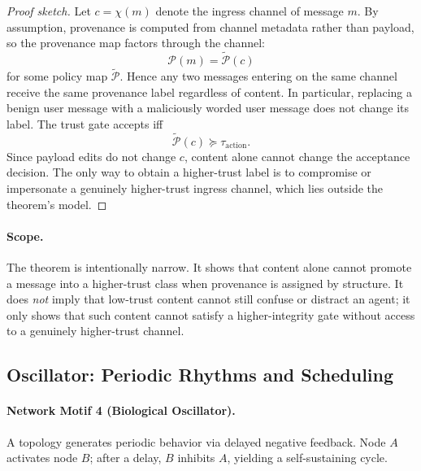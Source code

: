 \begin{proof}[Proof sketch]
Let $c=\chi(m)$ denote the ingress channel of message $m$. By assumption, provenance is computed from channel metadata rather than payload, so the provenance map factors through the channel:
\[
\mathcal{P}(m) = \widetilde{\mathcal{P}}(c)
\]
for some policy map $\widetilde{\mathcal{P}}$. Hence any two messages entering on the same channel receive the same provenance label regardless of content. In particular, replacing a benign user message with a maliciously worded user message does not change its label. The trust gate accepts iff
\[
\widetilde{\mathcal{P}}(c) \succeq \tau_{\text{action}}.
\]
Since payload edits do not change $c$, content alone cannot change the acceptance decision. The only way to obtain a higher-trust label is to compromise or impersonate a genuinely higher-trust ingress channel, which lies outside the theorem's model.
\end{proof}

\paragraph{Scope.}
The theorem is intentionally narrow. It shows that content alone cannot promote a message into a
higher-trust class when provenance is assigned by structure. It does \emph{not} imply that low-trust
content cannot still confuse or distract an agent; it only shows that such content cannot satisfy a
higher-integrity gate without access to a genuinely higher-trust channel.

\subsection{Oscillator: Periodic Rhythms and Scheduling}

\paragraph{Network Motif 4 (Biological Oscillator).}
A topology generates periodic behavior via delayed negative feedback. Node $A$ activates node $B$; after a delay, $B$ inhibits $A$, yielding a self-sustaining cycle.


